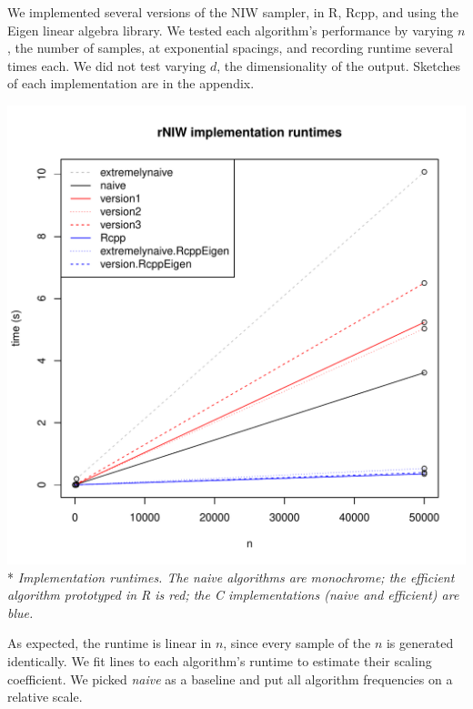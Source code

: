 \documentclass[english]{report}
\begin{document}


We implemented several versions of the NIW sampler, in R, Rcpp, and using the Eigen \cite{RcppEigen} linear algebra library. We tested each algorithm's performance by varying $n$, the number of samples, at exponential spacings, and recording runtime several times each. We did not test varying $d$, the dimensionality of the output. Sketches of each implementation are in the appendix.

\begin{center}
\includegraphics[scale=.5]{runtimes.pdf}\\*
\emph{Implementation runtimes. The naive algorithms are monochrome; the efficient algorithm prototyped in R is red; the C implementations (naive and efficient) are blue.}
\end{center}

As expected, the runtime is linear in $n$, since every sample of the $n$ is generated identically. We fit lines to each algorithm's runtime to estimate their scaling coefficient. We picked \emph{naive} as a baseline and put all algorithm frequencies on a relative scale.
\end{document}
